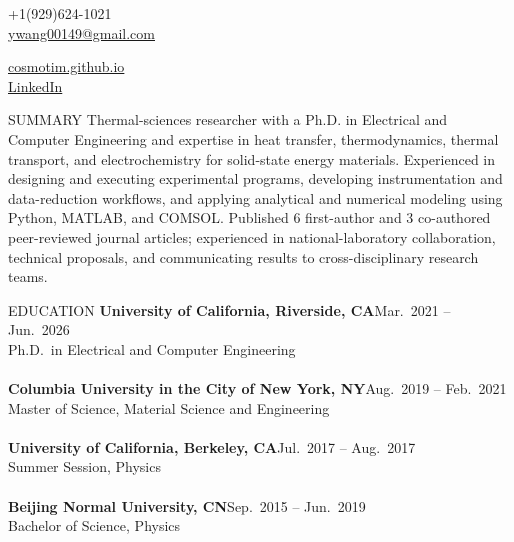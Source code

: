 \documentclass{resume} %
\begin{document}
\vspace{-1em}
\noindent
\begin{minipage}[t]{0.47\textwidth}
\raggedright
+1(929)624-1021 \\
\href{mailto:ywang00149@gmail.com}{ywang00149@gmail.com}
\end{minipage}\hfill
\begin{minipage}[t]{0.47\textwidth}
\raggedleft
\href{http://cosmotim.github.io}{cosmotim.github.io} \\
\href{http://linkedin.com/in/tim-wang-yitian/}{LinkedIn}
\end{minipage}
\vspace{0.5em}


\begin{rSection}{SUMMARY}
Thermal-sciences researcher with a Ph.D. in Electrical and Computer Engineering and expertise in heat transfer, thermodynamics, thermal transport, and electrochemistry for solid-state energy materials.
Experienced in designing and executing experimental programs, developing instrumentation and data-reduction workflows, and applying analytical and numerical modeling using Python, MATLAB, and COMSOL.
Published 6 first-author and 3 co-authored peer-reviewed journal articles; experienced in national-laboratory collaboration, technical proposals, and communicating results to cross-disciplinary research teams.
\end{rSection}


\begin{rSection}{EDUCATION}
{\bf University of California, Riverside, CA}\hfill{Mar.\ 2021 -- Jun.\ 2026}
\\ Ph.D.\ in Electrical and Computer Engineering
\\
\\{\bf Columbia University in the City of New York, NY}\hfill{Aug.\ 2019 -- Feb.\ 2021}
\\ Master of Science, Material Science and Engineering
\\
\\{\bf University of California, Berkeley, CA}\hfill{Jul.\ 2017 -- Aug.\ 2017}
\\ Summer Session, Physics
\\
\\{\bf Beijing Normal University, CN}\hfill{Sep.\ 2015 -- Jun.\ 2019}
\\ Bachelor of Science, Physics

\end{rSection}
\end{document}
